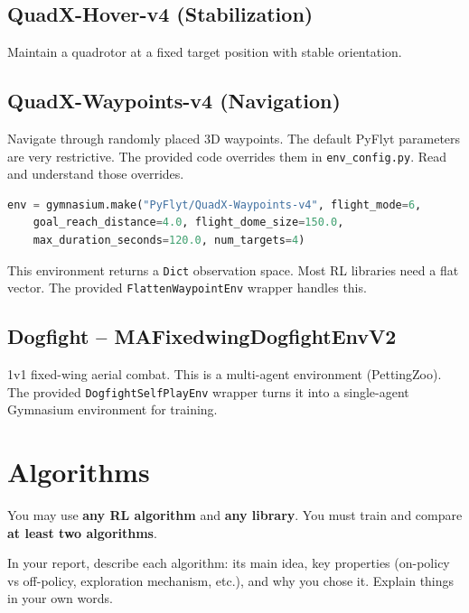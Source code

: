 \documentclass[11pt,a4paper]{article}
\begin{document}
\subsection{QuadX-Hover-v4 (Stabilization)}

Maintain a quadrotor at a fixed target position with stable orientation.

\subsection{QuadX-Waypoints-v4 (Navigation)}

Navigate through randomly placed 3D waypoints. The default PyFlyt parameters are very restrictive. The provided code overrides them in \texttt{env\_config.py}. Read and understand those overrides.

\begin{lstlisting}[language=Python, numbers=none]
env = gymnasium.make("PyFlyt/QuadX-Waypoints-v4", flight_mode=6,
    goal_reach_distance=4.0, flight_dome_size=150.0,
    max_duration_seconds=120.0, num_targets=4)
\end{lstlisting}

This environment returns a \texttt{Dict} observation space. Most RL libraries need a flat vector. The provided \texttt{FlattenWaypointEnv} wrapper handles this.

\subsection{Dogfight -- MAFixedwingDogfightEnvV2}

1v1 fixed-wing aerial combat. This is a multi-agent environment (PettingZoo). The provided \texttt{DogfightSelfPlayEnv} wrapper turns it into a single-agent Gymnasium environment for training.

\section{Algorithms}
\label{sec:algorithms}

You may use \textbf{any RL algorithm} and \textbf{any library}. You must train and compare \textbf{at least two algorithms}.

In your report, describe each algorithm: its main idea, key properties (on-policy vs off-policy, exploration mechanism, etc.), and why you chose it. Explain things in your own words.
\end{document}

